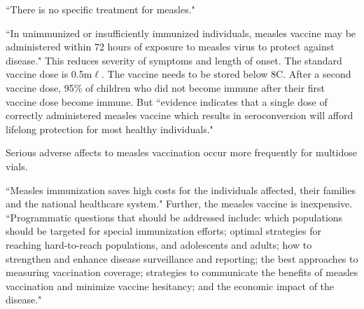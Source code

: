 ``There is no specific treatment for measles."

``In unimmunized or insufficiently immunized individuals, measles vaccine may be administered within 72 hours of exposure to measles virus to protect against disease." This reduces severity of symptoms and length of onset.
The standard vaccine dose is 0.5m$\ell$.
The vaccine needs to be stored below 8\textdegree C.
After a second vaccine dose, 95\% of children who did not become immune after their first vaccine dose become immune. But ``evidence indicates that a single dose
of correctly administered measles vaccine which results in seroconversion will afford lifelong protection for most healthy individuals."

Serious adverse affects to measles vaccination occur more frequently for multidose vials.

``Measles immunization saves high costs for the individuals
affected, their families and the national healthcare
system." Further, the measles vaccine is inexpensive.\\

``Programmatic
questions that should be addressed include: which
populations should be targeted for special immunization
efforts; optimal strategies for reaching hard-to-reach
populations, and adolescents and adults; how to
strengthen and enhance disease surveillance and
reporting; the best approaches to measuring vaccination
coverage; strategies to communicate the benefits of
measles vaccination and minimize vaccine hesitancy;
and the economic impact of the disease."\\
